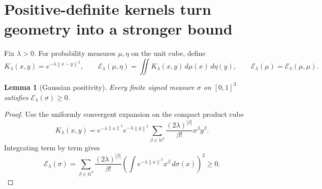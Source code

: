 \documentclass[11pt,letterpaper]{article}
\newtheorem{lemma}[theorem]{Lemma}
\theoremstyle{definition}
\newcommand{\NN}{\mathbb N}
\newcommand{\norm}[1]{\left\lVert #1\right\rVert}
\newcommand{\calE}{\mathcal E}
\begin{document}
\section{Positive-definite kernels turn geometry into a stronger bound}
\label{sec:kernel}
Fix \(\lambda>0\). For probability measures \(\mu,\eta\) on the unit
cube, define
\[
 K_\lambda(x,y)=e^{-\lambda\norm{x-y}^2},\qquad
 \calE_\lambda(\mu,\eta)=
 \iint K_\lambda(x,y)\,d\mu(x)\,d\eta(y),
 \qquad \calE_\lambda(\mu)=\calE_\lambda(\mu,\mu).
\]

\begin{lemma}[Gaussian positivity]
\label{lem:pd}
Every finite signed measure \(\sigma\) on \([0,1]^3\) satisfies
\(\calE_\lambda(\sigma)\ge0\).
\end{lemma}
\begin{proof}
Use the uniformly convergent expansion on the compact product cube
\[
 K_\lambda(x,y)
 =e^{-\lambda\norm{x}^2}e^{-\lambda\norm{y}^2}
 \sum_{\beta\in\NN^3}\frac{(2\lambda)^{|\beta|}}{\beta!}x^\beta y^\beta.
\]
Integrating term by term gives
\[
 \calE_\lambda(\sigma)=
 \sum_{\beta\in\NN^3}\frac{(2\lambda)^{|\beta|}}{\beta!}
 \left(\int e^{-\lambda\norm{x}^2}x^\beta\,d\sigma(x)\right)^2
 \ge0.
\]
\end{proof}
\end{document}
